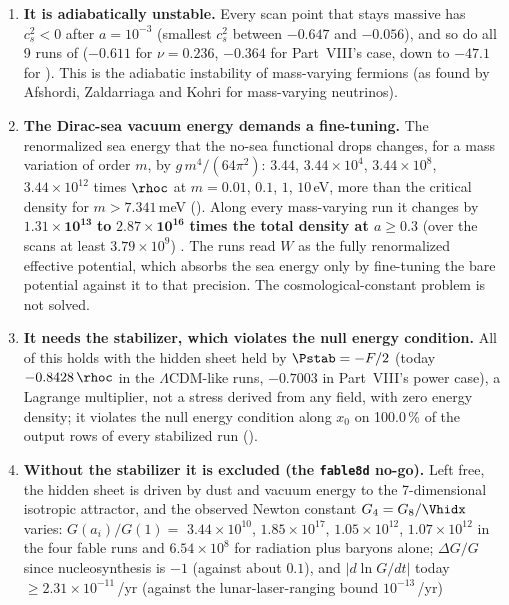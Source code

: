 \begin{enumerate}
        .
  \item \textbf{It is adiabatically unstable.} Every scan point that stays massive has $c_s^2<0$ after
        $a=10^{-3}$ (smallest $c_s^2$ between $-0.647$ and $-0.056$), and so do all 9 runs of 
        ($-0.611$ for $\nu=0.236$, $-0.364$ for Part~VIII's case, down to $-47.1$ for ). This is
        the adiabatic instability of mass-varying fermions (as found by Afshordi, Zaldarriaga and Kohri for
        mass-varying neutrinos).
  \item \textbf{The Dirac-sea vacuum energy demands a fine-tuning.} The renormalized sea energy that the no-sea
        functional drops changes, for a mass variation of order $m$, by $g\,m^4/(64\pi^2)$: $3.44$,
        $3.44\times10^{4}$, $3.44\times10^{8}$, $3.44\times10^{12}$ times $\rhoc$ at $m=0.01$, $0.1$, $1$, $10$\,eV,
        more than the critical density for $m>7.341$\,meV (). Along every mass-varying run it
        changes by $\boldsymbol{1.31\times10^{13}}$ \textbf{to} $\boldsymbol{2.87\times10^{16}}$ \textbf{times the
        total density at $a\geq0.3$} (over the scans at least $3.79\times10^{9}$) . The runs read
        $W$ as the fully renormalized effective potential, which absorbs the sea energy only by fine-tuning the
        bare potential against it to that precision. The cosmological-constant problem is not solved.
  \item \textbf{It needs the stabilizer, which violates the null energy condition.} All of this holds with the
        hidden sheet held by $\Pstab=-F/2$ (today $-0.8428\,\rhoc$ in the $\Lambda$CDM-like runs, $-0.7003$ in
        Part~VIII's power case), a Lagrange multiplier, not a stress derived from any field, with zero energy
        density; it violates the null energy condition along $x_0$ on 100.0\,\% of the output rows of every
        stabilized run ().
  \item \textbf{Without the stabilizer it is excluded (the \texttt{fable8d} no-go).} Left free, the hidden sheet
        is driven by dust and vacuum energy to the 7-dimensional isotropic attractor, and the observed Newton
        constant $G_4=G_8/\Vhidx$ varies: $G(a_i)/G(1)=$ $3.44\times10^{10}$, $1.85\times10^{17}$,
        $1.05\times10^{12}$, $1.07\times10^{12}$ in the four fable runs and $6.54\times10^{8}$ for radiation plus
        baryons alone; $\Delta G/G$ since nucleosynthesis is $-1$ (against about $0.1$), and $|d\ln G/dt|$ today
        $\geq2.31\times10^{-11}$\,/yr (against the lunar-laser-ranging bound $10^{-13}$\,/yr)

\end{enumerate}

